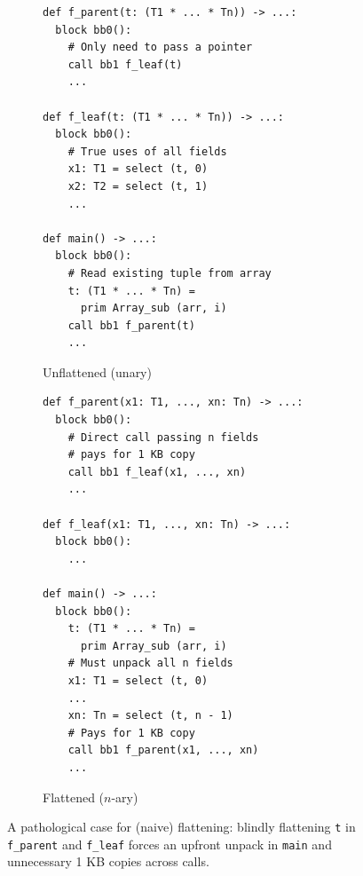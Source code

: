 \begin{figure}[htbp]
  \centering
  \begin{subfigure}[t]{0.48\textwidth}
    \caption{Unflattened (unary)}
    \label{fig:bad_flatten_unflattened}
    \vspace{1mm}
\begin{verbatim}
def f_parent(t: (T1 * ... * Tn)) -> ...:
  block bb0():
    # Only need to pass a pointer
    call bb1 f_leaf(t)
    ...

def f_leaf(t: (T1 * ... * Tn)) -> ...:
  block bb0():
    # True uses of all fields
    x1: T1 = select (t, 0)
    x2: T2 = select (t, 1)
    ...

def main() -> ...:
  block bb0():
    # Read existing tuple from array
    t: (T1 * ... * Tn) =
      prim Array_sub (arr, i)
    call bb1 f_parent(t)
    ...
\end{verbatim}
  \end{subfigure}\hfill
  \begin{subfigure}[t]{0.48\textwidth}
    \caption{Flattened ($n$-ary)}
    \label{fig:bad_flatten_flattened}
    \vspace{1mm}
\begin{verbatim}
def f_parent(x1: T1, ..., xn: Tn) -> ...:
  block bb0():
    # Direct call passing n fields
    # pays for 1 KB copy
    call bb1 f_leaf(x1, ..., xn)
    ...

def f_leaf(x1: T1, ..., xn: Tn) -> ...:
  block bb0():
    ...

def main() -> ...:
  block bb0():
    t: (T1 * ... * Tn) =
      prim Array_sub (arr, i)
    # Must unpack all n fields
    x1: T1 = select (t, 0)
    ...
    xn: Tn = select (t, n - 1)
    # Pays for 1 KB copy
    call bb1 f_parent(x1, ..., xn)
    ...
\end{verbatim}
  \end{subfigure}

  \caption{A pathological case for (naive) flattening: blindly flattening
    \texttt{t} in \texttt{f\_parent} and \texttt{f\_leaf} forces an upfront
    unpack in \texttt{main} and unnecessary 1 KB copies across calls.}

  \label{fig:bad_flatten_example}
\end{figure}


